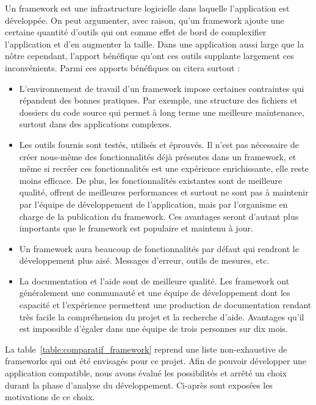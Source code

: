 \documentclass{EPL-master-thesis-covers-FR}
\begin{document}
				Un framework est une infrastructure logicielle dans laquelle l'application est développée. On peut argumenter, avec raison, qu'un framework ajoute une certaine quantité d'outils qui ont comme effet de bord de complexifier l'application et d'en augmenter la taille. Dans une application aussi large que la nôtre cependant, l'apport bénéfique qu'ont ces outils supplante largement ces inconvénients. Parmi ces apports bénéfiques on citera surtout :
				\begin{itemize}
					\item L'environnement de travail d'un framework impose certaines contraintes qui répandent des bonnes pratiques. Par exemple, une structure des fichiers et dossiers du code source qui permet à long terme une meilleure maintenance, surtout dans des applications complexes.
					\item Les outils fournis sont testés, utilisés et éprouvés. Il n'est pas nécessaire de créer nous-même des fonctionnalités déjà présentes dans un framework, et même si recréer ces fonctionnalités est une expérience enrichissante, elle reste moins efficace. De plus, les fonctionnalités existantes sont de meilleure qualité, offrent de meilleures performances et surtout ne sont pas à maintenir par l'équipe de développement de l'application, mais par l'organisme en charge de la publication du framework. Ces avantages seront d'autant plus importants que le framework est populaire et maintenu à jour.
					\item Un framework aura beaucoup de fonctionnalités par défaut qui rendront le développement plus aisé. Messages d'erreur, outils de mesures, etc.
					\item La documentation et l'aide sont de meilleure qualité. Les framework ont généralement une communauté et une équipe de développement dont les capacité et l'expérience permettent une production de documentation rendant très facile la compréhension du projet et la recherche d'aide. Avantages qu'il est impossible d'égaler dans une équipe de trois personnes sur dix mois.
				\end{itemize}

				La table~\ref{table:comparatif_framework} reprend une liste non-exhaustive de frameworks qui ont été envisagés pour ce projet. Afin de pouvoir développer une application compatible, nous avons évalué les possibilités et arrêté un choix durant la phase d'analyse du développement. Ci-après sont exposées les motivations de ce choix.
\end{document}
